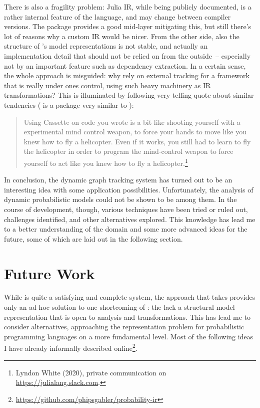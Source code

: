 There is also a fragility problem: Julia IR, while being publicly documented, is a rather internal
feature of the language, and may change between compiler versions.  The 
package provides a good mid-layer mitigating this, but still there's lot of reasons why a custom IR
would be nicer.  From the other side, also the structure of \dppljl{}'s model representations is not
stable, and actually an implementation detail that should not be relied on from the outside~--
especially not by an important feature such as dependency extraction.  In a certain sense, the whole
approach is misguided: why rely on external tracking for a framework that is really under ones
control, using such heavy machinery as IR transformations?  This is illuminated by following very
telling quote about similar tendencies ( is a package very similar to
):
\begin{quote}
  Using Cassette on code you wrote is a bit like shooting yourself with a experimental mind control
  weapon, to force your hands to move like you knew how to fly a helicopter.  Even if it works, you
  still had to learn to fly the helicopter in order to program the mind-control weapon to force
  yourself to act like you knew how to fly a helicopter.\footnote{Lyndon White (2020), private
    communication on \protect\url{https://julialang.slack.com}.}
\end{quote}

In conclusion, the dynamic graph tracking system has turned out to be an interesting idea with some
application possibilities.  Unfortunately, the analysis of dynamic probabilistic models could not be
shown to be among them.  In the course of development, though, various techniques have been tried or
ruled out, challenges identified, and other alternatives explored.  This knowledge has lead me to a
better understanding of the domain and some more advanced ideas for the future, some of which are
laid out in the following section.

\section{Future Work}
\label{sec:future-work}

While \irtrackerjl{} is quite a satisfying and complete system, the approach that \autogibbsjl{}
takes provides only an ad-hoc solution to one shortcoming of \turingjl{}: the lack a structural
model representation that is open to analysis and transformations.  This has lead me to consider
alternatives, approaching the representation problem for probabilistic programming languages on a
more fundamental level.  Most of the following ideas I have already informally described
online\footnote{\protect\url{https://github.com/phipsgabler/probability-ir}}.

